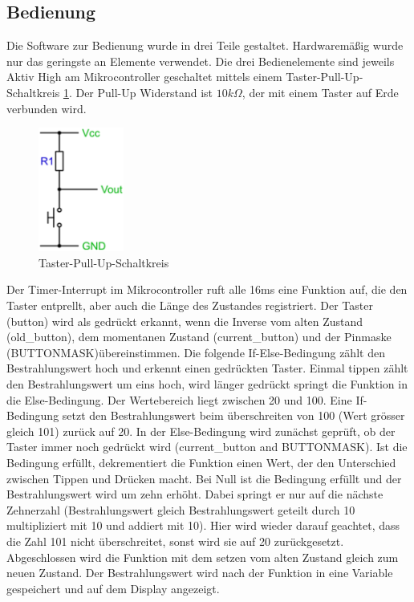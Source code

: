 \subsection{Bedienung}
Die Software zur Bedienung wurde in drei Teile gestaltet. Hardwaremäßig wurde nur das geringste an Elemente verwendet. Die drei Bedienelemente sind jeweils Aktiv High am Mikrocontroller geschaltet mittels einem Taster-Pull-Up-Schaltkreis \ref{fig:SwitchPullUp_Software}. Der Pull-Up Widerstand ist $10k\Omega$, der mit einem Taster auf Erde verbunden wird.

\begin{figure}[h]
	\centering
		\includegraphics[width=0.25\textwidth]{switchpullupcircuit.jpg}
	\caption{Taster-Pull-Up-Schaltkreis}
	\label{fig:SwitchPullUp_Software}
\end{figure}


Der Timer-Interrupt im Mikrocontroller ruft alle 16ms eine Funktion auf, die den Taster entprellt, aber auch die Länge des Zustandes registriert.
Der Taster (button) wird als gedrückt erkannt, wenn die Inverse vom alten Zustand (old\_button), dem momentanen Zustand (current\_button) und der Pinmaske (BUTTONMASK)übereinstimmen.
Die folgende If-Else-Bedingung zählt den Bestrahlungswert hoch und erkennt einen gedrückten Taster. Einmal tippen zählt den Bestrahlungswert um eins hoch, wird länger gedrückt springt die Funktion in die Else-Bedingung. Der Wertebereich liegt zwischen 20 und 100. Eine If-Bedingung setzt den Bestrahlungswert beim überschreiten von 100 (Wert grösser gleich 101) zurück auf 20.
In der Else-Bedingung wird zunächst geprüft, ob der Taster immer noch gedrückt wird (current\_button and BUTTONMASK). Ist die Bedingung erfüllt, dekrementiert die Funktion einen Wert, der den Unterschied zwischen Tippen und Drücken macht. Bei Null ist die Bedingung erfüllt und der Bestrahlungswert wird um zehn erhöht. Dabei springt er nur auf die nächste Zehnerzahl (Bestrahlungswert gleich Bestrahlungswert geteilt durch 10 multipliziert mit 10 und addiert mit 10). Hier wird wieder darauf geachtet, dass die Zahl 101 nicht überschreitet, sonst wird sie auf 20 zurückgesetzt.
Abgeschlossen wird die Funktion mit dem setzen vom alten Zustand gleich zum neuen Zustand.
Der Bestrahlungswert wird nach der Funktion in eine Variable gespeichert und auf dem Display angezeigt.
\newline